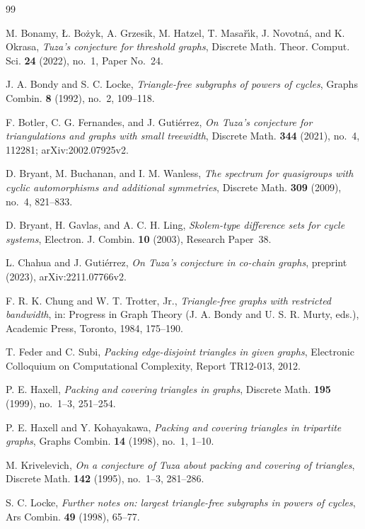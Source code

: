 \documentclass{amsart}
\theoremstyle{definition}
\theoremstyle{remark}
\numberwithin{equation}{section}
\numberwithin{table}{section}
\begin{document}
\begin{thebibliography}{99}

M. Bonamy, \L. Bo\.zyk, A. Grzesik, M. Hatzel, T. Masa\v{r}\'{\i}k, J. Novotn\'a, and K. Okrasa, \emph{Tuza's conjecture for threshold graphs}, Discrete Math. Theor. Comput. Sci. \textbf{24} (2022), no.~1, Paper No.~24.

J. A. Bondy and S. C. Locke, \emph{Triangle-free subgraphs of powers of cycles}, Graphs Combin. \textbf{8} (1992), no.~2, 109--118.

F. Botler, C. G. Fernandes, and J. Guti\'errez, \emph{On Tuza's conjecture for triangulations and graphs with small treewidth}, Discrete Math. \textbf{344} (2021), no.~4, 112281; arXiv:2002.07925v2.

D. Bryant, M. Buchanan, and I. M. Wanless, \emph{The spectrum for quasigroups with cyclic automorphisms and additional symmetries}, Discrete Math. \textbf{309} (2009), no.~4, 821--833.

D. Bryant, H. Gavlas, and A. C. H. Ling, \emph{Skolem-type difference sets for cycle systems}, Electron. J. Combin. \textbf{10} (2003), Research Paper~38.

L. Chahua and J. Guti\'errez, \emph{On Tuza's conjecture in co-chain graphs}, preprint (2023), arXiv:2211.07766v2.

F. R. K. Chung and W. T. Trotter, Jr., \emph{Triangle-free graphs with restricted bandwidth}, in: Progress in Graph Theory (J. A. Bondy and U. S. R. Murty, eds.), Academic Press, Toronto, 1984, 175--190.

T. Feder and C. Subi, \emph{Packing edge-disjoint triangles in given graphs}, Electronic Colloquium on Computational Complexity, Report TR12-013, 2012.

P. E. Haxell, \emph{Packing and covering triangles in graphs}, Discrete Math. \textbf{195} (1999), no.~1--3, 251--254.

P. E. Haxell and Y. Kohayakawa, \emph{Packing and covering triangles in tripartite graphs}, Graphs Combin. \textbf{14} (1998), no.~1, 1--10.

M. Krivelevich, \emph{On a conjecture of Tuza about packing and covering of triangles}, Discrete Math. \textbf{142} (1995), no.~1--3, 281--286.

S. C. Locke, \emph{Further notes on: largest triangle-free subgraphs in powers of cycles}, Ars Combin. \textbf{49} (1998), 65--77.


\end{thebibliography}
\end{document}
